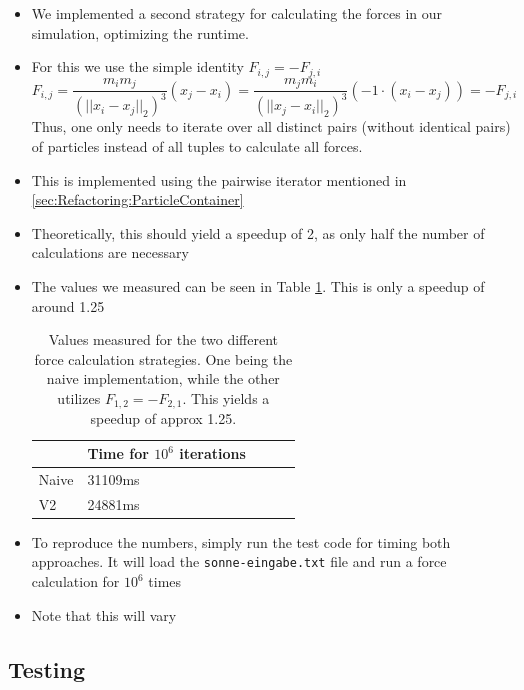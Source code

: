 \documentclass{article}
\begin{document}
\begin{itemize}
    \item We implemented a second strategy for calculating the forces in our simulation, optimizing the runtime.
    \item For this we use the simple identity $F_{i,j} = -F_{j,i}$
        \begin{equation}
            F_{i,j} = \frac{m_im_j}{(||x_i-x_j||_2)^3} (x_j - x_i) = \frac{m_jm_i}{(||x_j-x_i||_2)^3} \left(-1 \cdot \left(x_i - x_j\right)\right) = - F_{j,i} 
        \end{equation}
        Thus, one only needs to iterate over all distinct pairs (without identical pairs) of particles instead of all tuples to calculate all forces.
    \item This is implemented using the pairwise iterator mentioned in \ref{sec:Refactoring:ParticleContainer}
    \item Theoretically, this should yield a speedup of 2, as only half the number of calculations are necessary
    \item The values we measured can be seen in Table \ref{tab:speedup}. This is only a speedup of around 1.25
        \begin{table}[H]
            \centering
            \begin{tabular}{|l|l|l|l|l|}
            \hline
                & Time for $10^6$ iterations \\ \hline
            Naive & 31109ms                  \\ \hline
            V2    & 24881ms                  \\ \hline
            \end{tabular}
            \caption{Values measured for the two different force calculation strategies. One being the naive implementation, while the other utilizes $F_{1,2} = - F_{2,1}$. This yields a speedup of approx 1.25.}
            \label{tab:speedup}
        \end{table}
    \item To reproduce the numbers, simply run the test code for timing both approaches. It will load the \verb|sonne-eingabe.txt| file and run a force calculation for $10^6$ times
    \item Note that this will vary
\end{itemize}

\subsection{Testing}
\end{document}
